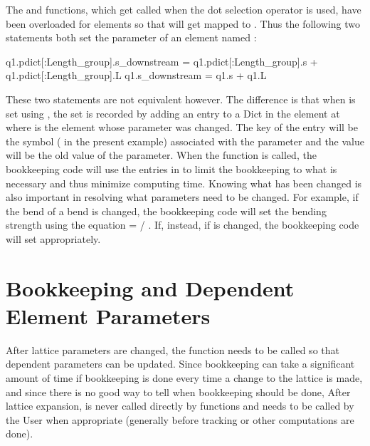 The  and  functions, which get called when the dot
selection operator is used, have been overloaded for elements so that  will get mapped to 
. Thus the following two statements both set the 
parameter of an element named :
\begin{example}
  q1.pdict[:Length_group].s_downstream = q1.pdict[:Length_group].s + q1.pdict[:Length_group].L
  q1.s_downstream = q1.s + q1.L
\end{example}
These two statements are not equivalent however. The difference is that when 
is set using , the set is recorded by adding an entry to a 
Dict in the element at  where  is the element whose parameter
was changed. The key of the entry will be the symbol ( in the present example)
associated with the parameter and the value will be the old value of the parameter. When
the  function is called, the bookkeeping code will use the
entries in  to limit the bookkeeping to what is necessary and thus
minimize computing time. Knowing what has been changed is also important in resolving what
parameters need to be changed. For example, if the bend  of a bend is changed, the bookkeeping code will set the 
bending strength  using the equation  =  / . If, instead, if
 is changed, the bookkeeping code will set  appropriately. 



\section{Bookkeeping and Dependent Element Parameters}
\label{s:param.depend}

After lattice parameters are changed, the function  needs to be called
so that dependent parameters can be updated. 
Since bookkeeping can take a significant amount of time if bookkeeping is done every time
a change to the lattice is made, and since there is no good way to tell when bookkeeping should
be done, After lattice expansion,  is never called directly by \accellat functions and needs to be called by the User when appropriate (generally before tracking or
other computations are done).

